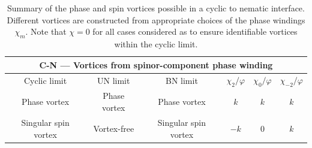 \begin{table}
    \centering
    \begin{tabular}{cccccc}
        \toprule
        \multicolumn{6}{c}{C-N --- Vortices from spinor-component phase
            winding} \\
        \midrule
        Cyclic limit & UN limit & BN limit & \(\chi_2/\varphi \) &
        \(\chi_0/\varphi \) & \(\chi_{-2}/\varphi \) \\
        \midrule
            Phase vortex & Phase vortex & Phase vortex & \(k\) & \(k\) & \(k\)\\
            Singular spin vortex & Vortex-free & Singular spin vortex & \(-k\)
            & 0 & \(k\) \\
        \bottomrule
    \end{tabular}
    \caption[Examples of possible vortex connections across a cyclic to nematic
    interface]{\label{tab: C-N-vortices}Summary of the phase and spin vortices
    possible in a cyclic to nematic interface.
    Different vortices are constructed from appropriate choices of the phase
    windings \(\chi_m\).
    Note that \(\chi=0\) for all cases considered as to
    ensure identifiable vortices within the cyclic limit.}
\end{table}

